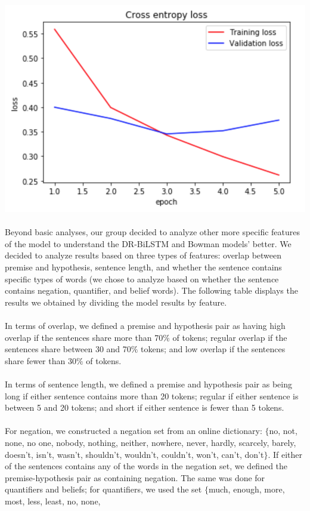 \documentclass[12pt,letterpaper]{article}
\begin{document}
\includegraphics[scale=0.58]{DRLSTMxent.png} \\
\\
Beyond basic analyses, our group decided to analyze other more specific features of the model to understand the DR-BiLSTM and Bowman models'  better. We decided to analyze results based on three types of features: overlap between premise and hypothesis, sentence length, and whether the sentence contains specific types of words (we chose to analyze based on whether the sentence contains negation, quantifier, and belief words). The following table displays the results we obtained by dividing the model results by feature. \\ \\
In terms of overlap, we defined a premise and hypothesis pair as having high overlap if the sentences share more than 70$\%$ of tokens; regular overlap if the sentences share between 30 and 70$\%$ tokens; and low overlap if the sentences share fewer than 30$\%$ of tokens. \\ \\ 
In terms of sentence length, we defined a premise and hypothesis pair as being long if either sentence contains more than 20 tokens; regular if either sentence is between 5 and 20 tokens; and short if either sentence is fewer than 5 tokens. \\ \\
For negation, we constructed a negation set from an online dictionary: $\{$no, not, none, no one, nobody, nothing, neither, nowhere, never, hardly, scarcely, barely, doesn’t, isn’t, wasn’t, shouldn’t, wouldn’t, couldn’t, won’t, can’t, don’t$\}$. If either of the sentences contains any of the words in the negation set, we defined the premise-hypothesis pair as containing negation. The same was done for quantifiers and beliefs; for quantifiers, we used the set $\{$much, enough, more, most, less, least, no, none,
\end{document}
